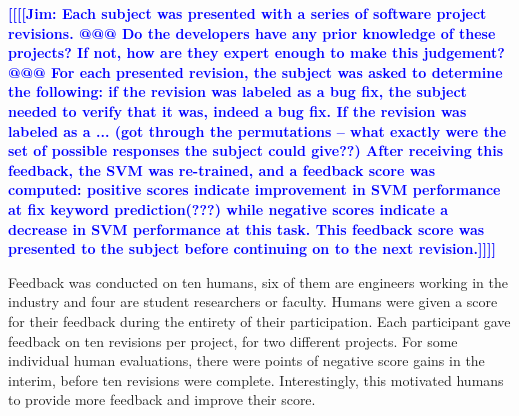 \documentclass[10pt, conference, letterpaper, compsocconf]{IEEEtran}
\newcommand{\todoc}[2]{{\textcolor{#1} {\textbf{[[#2]]}}}}
\newcommand{\todoblue}[1]{\todoc{blue}{\textbf{[[#1]]}}}
\newcommand{\jim}[1]{\todoblue{Jim: #1}}
\begin{document}
\jim{Each subject was presented with a series of software project revisions. @@@ Do the developers have any prior knowledge of these projects? If not, how are they expert enough to make this judgement? @@@
For each presented revision, the subject was asked to determine the following: if the revision was labeled as a bug fix, the subject needed to verify that it was, indeed a bug fix. If the revision was labeled as a ... (got through the permutations -- what exactly were the set of possible responses the subject could give??) After receiving this feedback, the SVM was re-trained, and a feedback score was computed: positive scores indicate improvement in SVM performance at fix keyword prediction(???) while negative scores indicate a decrease in SVM performance at this task. This feedback score was presented to the subject before continuing on to the next revision.}

Feedback was conducted on ten humans, six of them are engineers working in the industry and four are student researchers or faculty.
Humans were given a score for their feedback during the entirety of their participation. Each participant gave feedback on ten revisions per project, for two different projects.
For some individual human evaluations, there were points of negative score gains in the interim,
before ten revisions were complete. Interestingly, this motivated humans to provide more feedback and improve their score.
\end{document}
